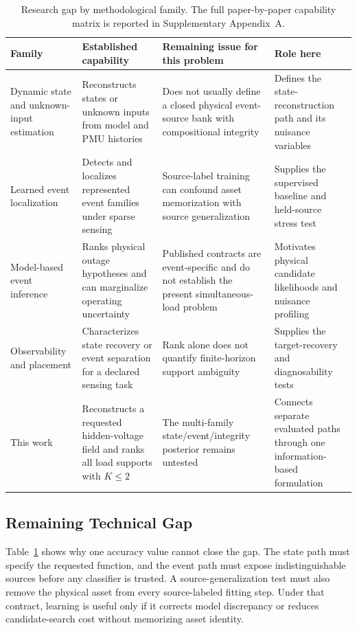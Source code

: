 \begin{table}[t]
\caption{Research gap by methodological family. The full paper-by-paper capability matrix is reported in Supplementary Appendix~A.}
\label{tab:literature-capability}
\centering
\footnotesize
\begin{tabularx}{\textwidth}{@{}lXXX@{}}
\toprule
Family & Established capability & Remaining issue for this problem & Role here \\
\midrule
Dynamic state and unknown-input estimation \cite{gillijns2007input,nugroho2022dae,katanic2024recursive} & Reconstructs states or unknown inputs from model and PMU histories & Does not usually define a closed physical event-source bank with compositional integrity & Defines the state-reconstruction path and its nuisance variables \\
Learned event localization \cite{pandey2020realtime,li2024knowledge,yildiz2024few} & Detects and localizes represented event families under sparse sensing & Source-label training can confound asset memorization with source generalization & Supplies the supervised baseline and held-source stress test \\
Model-based event inference \cite{tate2008outage,zhao2014outages,chen2016quickest} & Ranks physical outage hypotheses and can marginalize operating uncertainty & Published contracts are event-specific and do not establish the present simultaneous-load problem & Motivates physical candidate likelihoods and nuisance profiling \\
Observability and placement \cite{montanari2022functional,jamei2020limits,yildiz2025sparse} & Characterizes state recovery or event separation for a declared sensing task & Rank alone does not quantify finite-horizon support ambiguity & Supplies the target-recovery and diagnosability tests \\
This work & Reconstructs a requested hidden-voltage field and ranks all load supports with $K\le2$ & The multi-family state/event/integrity posterior remains untested & Connects separate evaluated paths through one information-based formulation \\
\bottomrule
\end{tabularx}
\end{table}

\subsection{Remaining Technical Gap}

Table~\ref{tab:literature-capability} shows why one accuracy value cannot close the gap. The state path must specify the requested function, and the event path must expose indistinguishable sources before any classifier is trusted. A source-generalization test must also remove the physical asset from every source-labeled fitting step. Under that contract, learning is useful only if it corrects model discrepancy or reduces candidate-search cost without memorizing asset identity.

